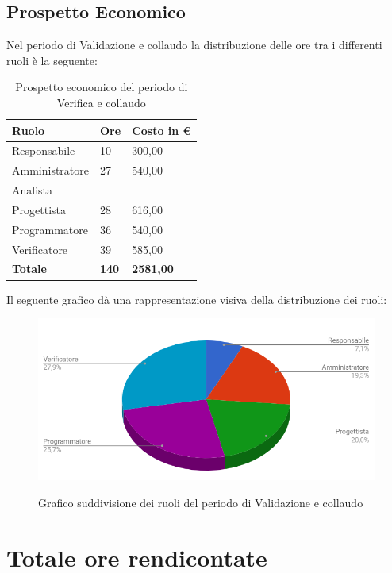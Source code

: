 \documentclass[PianoDiProgetto.tex]{subfiles}
\begin{document}
\subsection{Prospetto Economico}
Nel periodo di Validazione e collaudo la distribuzione delle ore tra i differenti ruoli è la seguente:
\begin{center}
	\begin{table}[htbp]
		\centering
		\renewcommand\arraystretch{1.5}
		\begin{tabularx}{\textwidth}{p{5cm}|p{4cm}|p{4cm}}
			\hline
			\textbf{Ruolo} & \textbf{Ore} & \textbf{Costo in \euro} \\
			\hline
			Responsabile & 10 & 300,00 \\
			\hline
			Amministratore & 27 & 540,00 \\
			\hline
			Analista & \ & \ \\
			\hline
			Progettista & 28 & 616,00 \\
			\hline
			Programmatore & 36 & 540,00 \\
			\hline
			Verificatore & 39 & 585,00 \\
			\hline
			\textbf{Totale} & \textbf{140} & \textbf{2581,00}\\
			\hline
		\end{tabularx}
	\caption{Prospetto economico del periodo di Verifica e collaudo}
	\label{my-label}
	\end{table} 
\end{center}
Il seguente grafico dà una rappresentazione visiva della distribuzione dei ruoli:
\begin{figure}[h]
	\centering
	\includegraphics[width=12.5cm]{images/prospettoEconomico/valCol.png}
	\label{fig:foo}
	\caption{Grafico suddivisione dei ruoli del periodo di Validazione e collaudo}
\end{figure} 
\clearpage
\section{Totale ore rendicontate}
\end{document}
